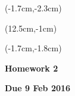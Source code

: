 \documentclass[12pt, oneside]{article}
\begin{document}


\begin{textblock*}{4cm}(-1.7cm,-2.3cm)
\end{textblock*}

\begin{textblock*}{8cm}(12.5cm,-1cm)
\end{textblock*}
\begin{textblock*}{13.5cm}(-1.7cm,-1.8cm)
\end{textblock*}

\vspace{1cm}

\begin{center}
\textbf{\Large Homework 2}

\textbf{Due 9 Feb 2016}
\end{center}
\end{document}
